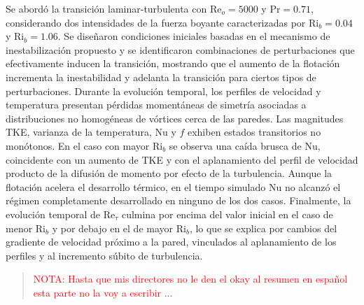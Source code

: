 \begin{resumen}
Se abordó la transición laminar-turbulenta con $\text{Re}_o=5000$ y $\text{Pr}=0\text{.}71$, considerando dos intensidades de la fuerza boyante caracterizadas por $\text{Ri}_b=0\text{.}04$ y $\text{Ri}_b=1\text{.}06$. Se diseñaron condiciones iniciales basadas en el mecanismo de inestabilización propuesto y se identificaron combinaciones de perturbaciones que efectivamente inducen la transición, mostrando que el aumento de la flotación incrementa la inestabilidad y adelanta la transición para ciertos tipos de perturbaciones. Durante la evolución temporal, los perfiles de velocidad y temperatura presentan pérdidas momentáneas de simetría asociadas a distribuciones no homogéneas de vórtices cerca de las paredes. Las magnitudes TKE, varianza de la temperatura, Nu y $f$ exhiben estados transitorios no monótonos. En el caso con mayor $\text{Ri}_b$ se observa una caída brusca de Nu, coincidente con un aumento de TKE y con el aplanamiento del perfil de velocidad producto de la difusión de momento por efecto de la turbulencia. Aunque la flotación acelera el desarrollo térmico, en el tiempo simulado Nu no alcanzó el régimen completamente desarrollado en ninguno de los dos casos. Finalmente, la evolución temporal de $\text{Re}_{\tau}$ culmina por encima del valor inicial en el caso de menor $\text{Ri}_b$ y por debajo en el de mayor $\text{Ri}_b$, lo que se explica por cambios del gradiente de velocidad próximo a la pared, vinculados al aplanamiento de los perfiles y al incremento súbito de turbulencia.



\end{resumen}


\begin{abstract}%
\textcolor{red}{NOTA: Hasta que mis directores no le den el okay al resumen en español esta parte no la voy a escribir ...}
\end{abstract}



